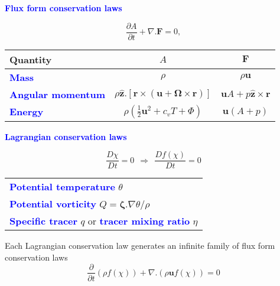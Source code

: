 \documentclass[a4]{seminar}
\newcommand{\B}[1]{\textcolor{blue}{#1}}
\begin{document}

\begin{slide}

\B{\bf Flux form conservation laws}

\begin{displaymath}
\frac{\partial A}{\partial t}+\nabla .\mathbf{F}=0,
\end{displaymath}

\vspace{3mm}

\begin{tabular}{|l|cc|}
\hline
Quantity
&
\( A \)
&
\( \mathbf{F} \)
\\
\hline
\hline
\B{\bf Mass}
&
\( \rho \)
&
\( \rho \mathbf{u} \)
\\
\hline
\B{\bf Angular momentum}
&
\( \rho \widehat{\mathbf{z}}.\left[ \mathbf{r}\times
\left( \mathbf{u}+\boldsymbol{\Omega} \times \mathbf{r}\right) \right] \)
&
\( \mathbf{u}A+p\widehat{\mathbf{z}}\times \mathbf{r} \)
\\
\hline
\B{\bf Energy}
&
\( \rho \left( \frac{1}{2}\mathbf{u}^{2}+c_{v}T+\Phi \right)  \)
&
\( \mathbf{u}\left( A+p\right) \)
\\
\hline
\end{tabular}



\end{slide}


\begin{slide}

\B{\bf Lagrangian conservation laws}

\begin{displaymath}
\frac{D \chi}{D t} = 0 \ \ \Rightarrow \ \ \frac{D f(\chi)}{D t} = 0
\end{displaymath}

\vspace{2mm}

\begin{tabular}{|l|}
\hline
\B{\bf Potential temperature} \( \theta \) \\
\B{\bf Potential vorticity} \( Q = \boldsymbol{\zeta} . \nabla \theta / \rho \) \\
\B{\bf Specific tracer} \( q \) or \B{\bf tracer mixing ratio} \( \eta \) \\
\hline
\end{tabular}

\vspace{2mm}

Each Lagrangian conservation law generates an infinite family of
flux form conservation laws
\begin{displaymath}
\frac{\partial }{\partial t} \left( \rho f(\chi) \right)
+
\nabla .\left( \rho \mathbf{u} f(\chi) \right) = 0
\end{displaymath}


\end{slide}
\end{document}
